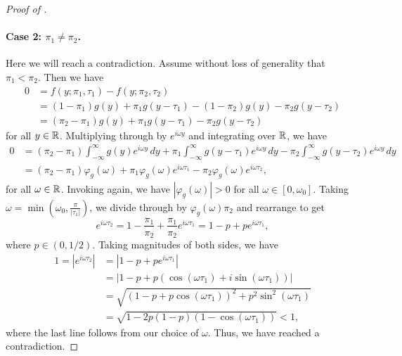 \begin{proof}[Proof of ]
\paragraph{Case 2: $\pi_1 \neq \pi_2$.} Here we will reach a contradiction. Assume without loss of generality that $\pi_1 < \pi_2$. Then we have
\begin{align*}
0 &= f(y;\pi_1, \tau_1) - f(y;\pi_2, \tau_2) \\
&= (1- \pi_1) g(y) + \pi_1 g(y-\tau_1) - (1- \pi_2) g(y) - \pi_2 g(y-\tau_2) \\
&= (\pi_2 - \pi_1) g(y) + \pi_1 g(y-\tau_1) - \pi_2 g(y-\tau_2)
\end{align*}
for all $y \in \mathbb{R}$. Multiplying through by $e^{i \omega y}$ and integrating over $\mathbb{R}$, we have
\begin{align*}
0 &= (\pi_2 - \pi_1) \int_{-\infty}^\infty g(y) e^{i \omega y} \, dy + \pi_1\int_{-\infty}^\infty g(y-\tau_1) e^{i \omega y} \, dy - \pi_2 \int_{-\infty}^\infty g(y-\tau_2) e^{i \omega y} \, dy \\
&= (\pi_2 - \pi_1) \varphi_g(\omega) + \pi_1 \varphi_g(\omega) e^{i\omega \tau_1} - \pi_2 \varphi_g(\omega) e^{i\omega \tau_2},
\end{align*}
for all $\omega \in \mathbb{R}$. Invoking  again, we have $|\varphi_g(\omega)| > 0$ for all $\omega \in [0, \omega_0]$.  Taking $\omega = \min( \omega_0, \frac{\pi}{|\tau_1|})$, we divide through by $\varphi_g(\omega) \pi_2$ and rearrange to get
\[ e^{i \omega \tau_2} = 1 - \frac{\pi_1}{\pi_2} + \frac{\pi_1}{\pi_2} e^{i \omega \tau_1} = 1 - p + p e^{i \omega \tau_1},\]
where $p \in (0, 1/2)$. Taking magnitudes of both sides, we have
\begin{align*}
1 = \left| e^{i \omega \tau_2} \right| &= \left| 1 - p + p e^{i \omega \tau_1} \right| \\
&= \left| 1 - p + p( \cos(\omega \tau_1) + i \sin(\omega \tau_1)) \right| \\
&= \sqrt{ (1 - p + p \cos(\omega \tau_1))^2 + p^2 \sin^2(\omega \tau_1) } \\
&= \sqrt{ 1 - 2p(1-p)(1-\cos(\omega \tau_1))} < 1,
\end{align*}
where the last line follows from our choice of $\omega$. Thus, we have reached a contradiction.
\end{proof}
    


